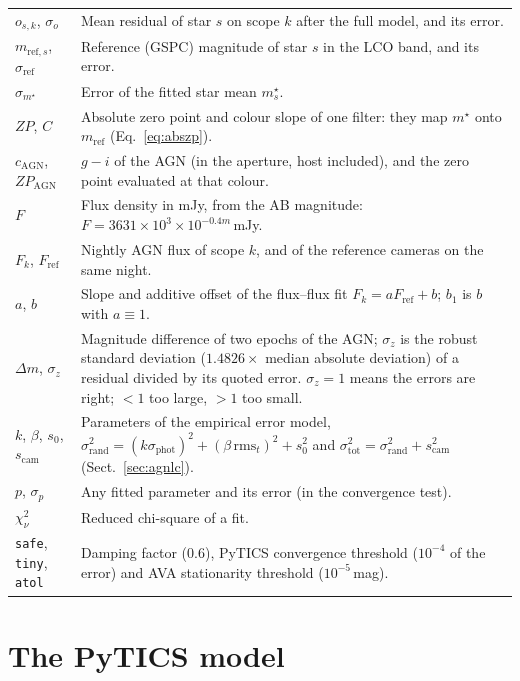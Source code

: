 \documentclass[10pt,a4paper,oneside]{report}
\renewcommand{\_}{\oldunderscore\allowbreak}
\begin{document}
\begin{table}[!htbp]
\begin{tabularx}{\textwidth}{lX}
$o_{s,k}$, $\sigma_o$ & Mean residual of star $s$ on scope $k$ after the full model, and its error. \\
$m_{\mathrm{ref},s}$, $\sigma_\mathrm{ref}$ & Reference (GSPC) magnitude of star $s$ in the LCO band, and its error. \\
$\sigma_{m^\star}$ & Error of the fitted star mean $m^\star_s$. \\
$ZP$, $C$ & Absolute zero point and colour slope of one filter: they map $m^\star$ onto $m_\mathrm{ref}$ (Eq.~\ref{eq:abszp}). \\
$c_\mathrm{AGN}$, $ZP_\mathrm{AGN}$ & $g-i$ of the AGN (in the aperture, host included), and the zero point evaluated at that colour. \\
$F$ & Flux density in mJy, from the AB magnitude: $F = 3631\times10^{3}\times10^{-0.4m}$\,mJy. \\
$F_k$, $F_\mathrm{ref}$ & Nightly AGN flux of scope $k$, and of the reference cameras on the same night. \\
$a$, $b$ & Slope and additive offset of the flux--flux fit $F_k = aF_\mathrm{ref}+b$; $b_1$ is $b$ with $a\equiv1$. \\
$\Delta m$, $\sigma_z$ & Magnitude difference of two epochs of the AGN; $\sigma_z$ is the robust standard
  deviation ($1.4826\times$ median absolute deviation) of a residual divided by its quoted error. $\sigma_z=1$
  means the errors are right; $<1$ too large, $>1$ too small. \\
$k$, $\beta$, $s_0$, $s_\mathrm{cam}$ & Parameters of the empirical error model,
  $\sigma_\mathrm{rand}^2=(k\sigma_\mathrm{phot})^2+(\beta\,\mathrm{rms}_t)^2+s_0^2$ and
  $\sigma_\mathrm{tot}^2=\sigma_\mathrm{rand}^2+s_\mathrm{cam}^2$ (Sect.~\ref{sec:agnlc}). \\
$p$, $\sigma_p$ & Any fitted parameter and its error (in the convergence test). \\
$\chi^2_\nu$ & Reduced chi-square of a fit. \\
\texttt{safe}, \texttt{tiny}, \texttt{atol} & Damping factor (0.6), PyTICS convergence threshold ($10^{-4}$
  of the error) and AVA stationarity threshold ($10^{-5}$\,mag). \\
\bottomrule
\end{tabularx}
\end{table}

\section{The PyTICS model}
\end{document}
